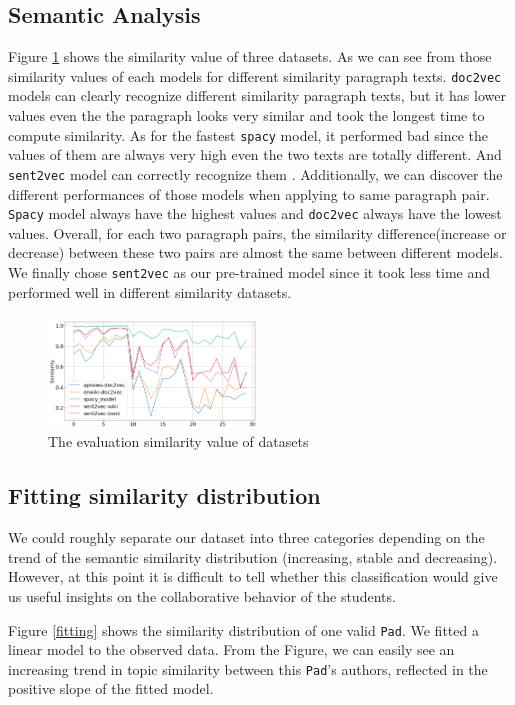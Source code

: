 \subsection{Semantic Analysis}
\label{sub:result_semantic}
Figure \ref{similar} shows the similarity value of three datasets. As we can see from those similarity values of each models for different similarity paragraph texts. \texttt{doc2vec} models can clearly recognize different similarity paragraph texts, but it has lower values even the the paragraph looks very similar and took the longest time to compute similarity. As for the fastest \texttt{spacy} model, it performed bad since the values of them are always very high even the two texts are totally different. And \texttt{sent2vec} model can correctly recognize them . Additionally, we can discover the different performances of those models when applying to same paragraph pair. \texttt{Spacy} model always have the highest values and  \texttt{doc2vec} always have the lowest values.  Overall, for each two paragraph pairs, the similarity difference(increase or decrease) between these two pairs are almost the same between different models. We finally chose \texttt{sent2vec} as our pre-trained model since it took less time and performed well in different similarity datasets.
    \begin{figure}[htp]
        \centering
        \includegraphics[width=0.5\textwidth]{figures/pre-trained-text.png}
        \caption{The evaluation similarity value of datasets}
        \label{similar}
    \end{figure}
    
\subsection{Fitting similarity distribution}
We could roughly separate our dataset into three categories depending on the trend of the semantic similarity distribution (increasing, stable and decreasing). However, at this point it is difficult to tell whether this classification would give us useful insights on the collaborative behavior  of the students.

Figure \ref{fitting} shows the similarity distribution of one valid \texttt{Pad}. We fitted a linear model to the observed data. From the Figure, we can easily see an increasing trend in topic similarity between this \texttt{Pad}'s authors, reflected in the positive slope of the fitted model. 

